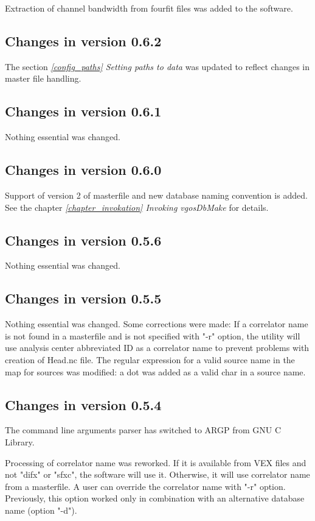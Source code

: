 \documentclass [10pt,letterpaper]{report}
\begin{document}
Extraction of channel bandwidth from fourfit files was added to the software.

\subsection{Changes in version 0.6.2}
The section \emph{\ref{config_paths} Setting paths to data} was updated to reflect
changes in master file handling.

\subsection{Changes in version 0.6.1}
Nothing essential was changed.

\subsection{Changes in version 0.6.0}
Support of version 2 of masterfile and new database naming convention is added.
See the chapter \emph{\ref{chapter_invokation} Invoking vgosDbMake} for details.


\subsection{Changes in version 0.5.6}
Nothing essential was changed.


\subsection{Changes in version 0.5.5}
Nothing essential was changed. Some corrections were made: If a correlator name is not
found in a masterfile and is not specified with "-r" option, the utility will use
analysis center abbreviated ID as a correlator name to prevent problems with creation
of Head.nc file. The regular expression for a valid source name in the map for sources
was modified: a dot was added as a valid char in a source name.


\subsection{Changes in version 0.5.4}
The command line arguments parser has switched to ARGP from GNU C Library.

Processing of correlator name was reworked. If it is available from VEX
files and not "difx" or "sfxc", the software will use it. Otherwise, it will
use correlator name from a masterfile. A user can override the correlator
name with "-r" option. Previously, this option worked only in combination
with an alternative database name (option "-d").
\end{document}
